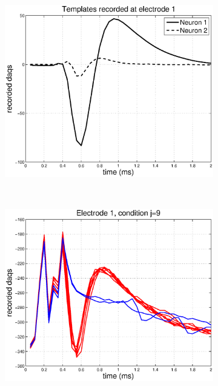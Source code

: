 \documentclass[12pt,letterpaper,fleqn]{article}
\begin{document}
\begin{figure}[ht!]
        \centering
        \begin{subfigure}[b]{0.23\textwidth}
                \includegraphics[width=\textwidth]{TemplateEL1.eps}
                \caption{}
        \end{subfigure}%
~\begin{subfigure}[b]{0.23\textwidth}
                \includegraphics[width=\textwidth]{EL11.eps}
                \caption{}
        \end{subfigure}
      ~  \begin{subfigure}[b]{0.23\textwidth}

\end{subfigure}
\end{figure}
\end{document}
